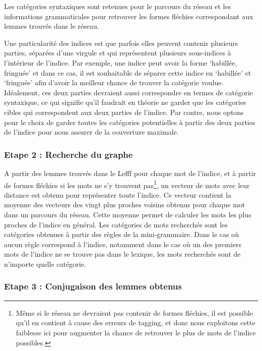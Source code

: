 \documentclass[a4paper, 12pt]{article}
\begin{document}
Les catégories syntaxiques sont retenues pour le parcours du réseau et les 
informations grammaticales pour retrouver les formes fléchies correspondant aux 
lemmes trouvés dans le réseau.

Une particularité des indices est que parfois elles peuvent contenir plusieurs 
parties, séparées d'une virgule et qui représentent plusieurs sous-indices à 
l'intérieur de l'indice. Par exemple, une indice peut avoir la forme 
\lq{habillée, fringuée}\rq{} et dans ce cas, il est souhaitable de séparer cette 
indice en \lq{habillée}\rq{} et \lq{fringuée}\rq{} afin d'avoir la meilleur 
chance de trouver la catégorie voulue. Idéalement, ces deux parties devraient 
aussi correspondre en termes de catégorie syntaxique, ce qui signifie qu'il 
faudrait en théorie ne garder que les catégories cibles qui correspondent aux 
deux parties de l'indice. Par contre, nous optons pour le choix de garder toutes 
les catégories potentielles à partir des deux parties de l'indice pour nous 
assurer de la couverture maximale. 

\subsubsection{Etape 2 : Recherche du graphe}

A partir des lemmes trouvés dans le Lefff pour chaque mot de l'indice, et à 
partir de formes fléchies si les mots ne s'y trouvent pas\footnote{Même si le 
réseau ne devraient pas contenir de formes fléchies, il est possible qu'il en 
contient à cause des erreurs de tagging, et donc nous exploitons cette faiblesse 
ici pour augmenter la chance de retrouver le plus de mots de l'indice 
possibles.}, un vecteur de mots avec leur distance est obtenu pour représenter 
toute l'indice. Ce vecteur contient la moyenne des vecteurs des vingt plus 
proches voisins obtenus pour chaque mot dans un parcours du réseau. Cette 
moyenne permet de calculer les mots les plus proches de l'indice en général. Les 
catégories de mots recherchés sont les catégories obtenues à partir des règles 
de la mini-grammaire. Dans le cas où aucun règle correspond à l'indice, 
notamment dans le cas où un des premiers mots de l'indice ne se trouve pas dans 
le lexique, les mots recherchés sont de n'importe quelle catégorie.

\subsubsection{Etape 3 : Conjugaison des lemmes obtenus}
\end{document}
